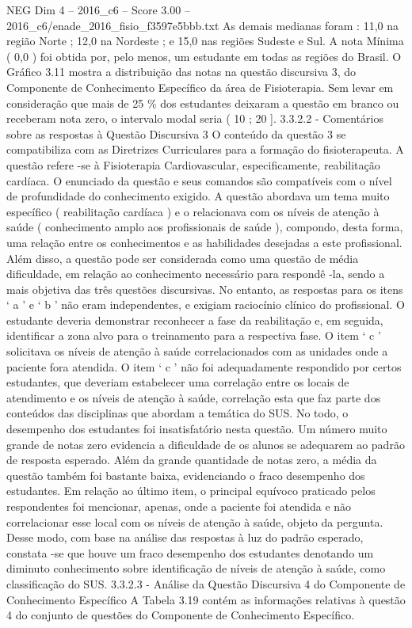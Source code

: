 \begin{textsample}{NEG Dim 4 – 2016\_c6 – Score 3.00 – 2016\_c6/enade\_2016\_fisio\_f3597e5bbb.txt}
As demais medianas foram : 11,0 na região Norte ; 12,0 na Nordeste ; e 15,0 nas regiões Sudeste e Sul.
A nota Mínima ( 0,0 ) foi obtida por, pelo menos, um estudante em todas as regiões do Brasil.
O Gráfico 3.11 mostra a distribuição das notas na questão discursiva 3, do Componente de Conhecimento Específico da área de Fisioterapia.
Sem levar em consideração que mais de 25 \% dos estudantes deixaram a questão em branco ou receberam nota zero, o intervalo modal seria ( 10 ; 20 ]. 3.3.2.2 - Comentários sobre as respostas à Questão Discursiva 3 O conteúdo da questão 3 se compatibiliza com as Diretrizes Curriculares para a formação do fisioterapeuta.
A questão refere -se à Fisioterapia Cardiovascular, especificamente, reabilitação cardíaca.
O enunciado da questão e seus comandos são compatíveis com o nível de profundidade do conhecimento exigido.
A questão abordava um tema muito específico ( reabilitação cardíaca ) e o relacionava com os níveis de atenção à saúde ( conhecimento amplo aos profissionais de saúde ), compondo, desta forma, uma relação entre os conhecimentos e as habilidades desejadas a este profissional.
Além disso, a questão pode ser considerada como uma questão de média dificuldade, em relação ao conhecimento necessário para respondê -la, sendo a mais objetiva das três questões discursivas.
No entanto, as respostas para os itens ‘ a ’ e ‘ b ’ não eram independentes, e exigiam raciocínio clínico do profissional.
O estudante deveria demonstrar reconhecer a fase da reabilitação e, em seguida, identificar a zona alvo para o treinamento para a respectiva fase.
O item ‘ c ’ solicitava os níveis de atenção à saúde correlacionados com as unidades onde a paciente fora atendida.
O item ‘ c ’ não foi adequadamente respondido por certos estudantes, que deveriam estabelecer uma correlação entre os locais de atendimento e os níveis de atenção à saúde, correlação esta que faz parte dos conteúdos das disciplinas que abordam a temática do SUS.
No todo, o desempenho dos estudantes foi insatisfatório nesta questão.
Um número muito grande de notas zero evidencia a dificuldade de os alunos se adequarem ao padrão de resposta esperado.
Além da grande quantidade de notas zero, a média da questão também foi bastante baixa, evidenciando o fraco desempenho dos estudantes.
Em relação ao último item, o principal equívoco praticado pelos respondentes foi mencionar, apenas, onde a paciente foi atendida e não correlacionar esse local com os níveis de atenção à saúde, objeto da pergunta.
Desse modo, com base na análise das respostas à luz do padrão esperado, constata -se que houve um fraco desempenho dos estudantes denotando um diminuto conhecimento sobre identificação de níveis de atenção à saúde, como classificação do SUS. 3.3.2.3 - Análise da Questão Discursiva 4 do Componente de Conhecimento Específico A Tabela 3.19 contém as informações relativas à questão 4 do conjunto de questões do Componente de Conhecimento Específico.

\end{textsample}
